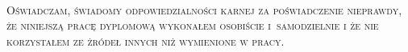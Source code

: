 \thispagestyle{empty}
\
\vfill

\begin{flushright}

\begin{minipage}{0.65\textwidth}

\textsc{Oświadczam, świadomy odpowiedzialności karnej za poświadczenie nieprawdy,  że niniejszą pracę dyplomową wykonałem osobiście i~samodzielnie i że nie korzystałem ze żródeł innych niż wymienione w pracy.}\\

\raggedleft \ \\[0.2cm]
\
\end{minipage}

\end{flushright}
